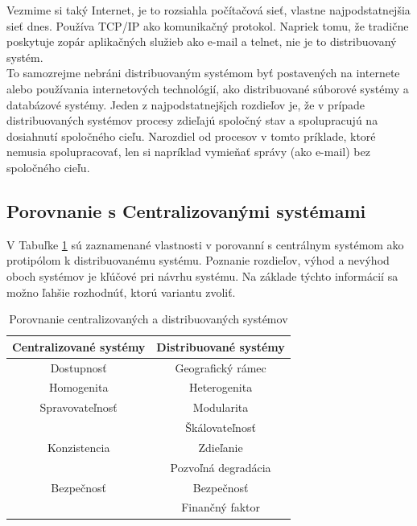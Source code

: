 \begin{exmpl}
	Vezmime si taký Internet, je to rozsiahla počítačová sieť, vlastne najpodstatnejšia sieť dnes. Používa TCP/IP ako komunikačný protokol.
	Napriek tomu, že tradične poskytuje zopár aplikačných služieb ako e-mail a telnet, nie je to distribuovaný systém. \\
	
	To samozrejme nebráni distribuovaným systémom byť postavených na internete alebo používania internetových technológií, ako distribuované súborové systémy a databázové systémy.
	Jeden z najpodstatnejšįch rozdieľov je, že v prípade distribuovaných systémov procesy zdieľajú spoločný stav a spolupracujú na dosiahnutí spoločného cieľu. Narozdiel od procesov v tomto príklade, ktoré nemusia spolupracovať, len si napríklad vymieňať správy (ako e-mail) bez spoločného cieľu.
\end{exmpl}

\subsection{Porovnanie s Centralizovanými systémami}

V Tabuľke \ref{Tab:central_vs_distr} sú zaznamenané vlastnosti v porovanní s centrálnym systémom ako protipólom k distribuovanému systému. Poznanie rozdieľov, výhod a nevýhod oboch systémov je kľúčové pri návrhu systému. Na základe týchto informácií sa možno ľahšie rozhodnúť, ktorú variantu zvoliť.

\begin{table} [ht]
\begin{center}
	\begin{tabular}{| c | c |} 
		\hline
		Centralizované systémy & Distribuované systémy \\ [0.5ex] 
		\hline\hline
		Dostupnosť & Geografický rámec \\ 
		Homogenita & Heterogenita \\
		Spravovateľnosť & Modularita \\
		 & Škálovateľnosť \\
		 Konzistencia & Zdieľanie \\
		 & Pozvoľná degradácia \\
		 Bezpečnosť & Bezpečnosť \\
		 & Finančný faktor \\ [1ex] 
		\hline
	\end{tabular}
\end{center}
\caption{Porovnanie centralizovaných a distribuovaných systémov}
\label{Tab:central_vs_distr}
\end{table}

